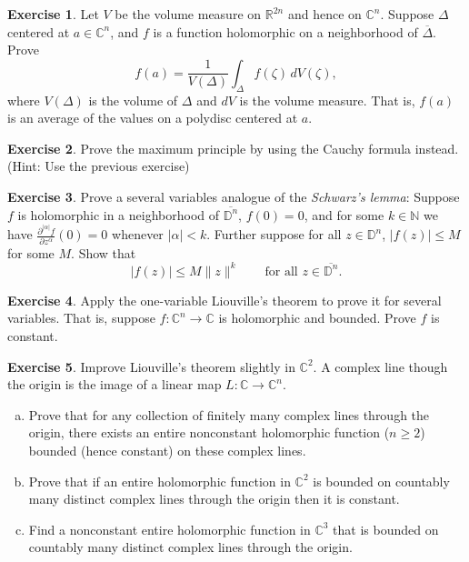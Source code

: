 \documentclass[12pt,openany]{book}
\newcommand{\sabs}[1]{\lvert {#1} \rvert}
\newcommand{\snorm}[1]{\lVert {#1} \rVert}
\newcommand{\C}{{\mathbb{C}}}
\newcommand{\R}{{\mathbb{R}}}
\newcommand{\N}{{\mathbb{N}}}
\newcommand{\D}{{\mathbb{D}}}
\newcommand{\myindex}[1]{#1\index{#1}}
\theoremstyle{plain}
\theoremstyle{remark}
\theoremstyle{definition}
\newenvironment{exbox}{%
    \def\FrameCommand{\vrule width 1pt \relax\hspace {10pt}}%
    \MakeFramed {\advance \hsize -\width \FrameRestore }%
}{%
    \endMakeFramed
}
\newenvironment{exparts}{%
    \leavevmode\begin{enumerate}[a),noitemsep,topsep=0pt,parsep=0pt,partopsep=0pt]
}{%
    \end{enumerate}
}
\theoremstyle{exercise}
\newtheorem{exercise}{Exercise}[section]
\theoremstyle{example}
\begin{document}
\begin{exbox}
\begin{exercise} \label{exercise:averageDelta}
Let $V$ be the volume measure on $\R^{2n}$ and hence on $\C^n$.
Suppose $\Delta$ centered at $a \in \C^n$, and $f$ is a function holomorphic on
a neighborhood of $\overline{\Delta}$.  Prove
\begin{equation*}
f(a) =
\frac{1}{V(\Delta)}
\int_{\Delta} f(\zeta) \, dV(\zeta) ,
\end{equation*}
where $V(\Delta)$ is the volume of $\Delta$ and $dV$ is the volume measure.
That is, $f(a)$ is an average of the values on a polydisc centered at $a$.
\end{exercise}

\begin{exercise}
Prove the maximum principle by using the Cauchy formula instead.  (Hint:
Use the previous exercise)
\end{exercise}

\begin{exercise}
Prove a several variables analogue of the \emph{\myindex{Schwarz's lemma}}:
Suppose $f$ is holomorphic in a neighborhood of $\overline{\D^n}$,
$f(0) = 0$, and for some $k \in \N$ we have
$\frac{\partial^{\sabs{\alpha}} f}{\partial z^\alpha} (0) =
0$ whenever $\sabs{\alpha} < k$.  Further suppose 
for all $z \in \D^n$,
$\sabs{f(z)} \leq M$ for some $M$.  Show that
\begin{equation*}
\sabs{f(z)} \leq M \snorm{z}^k
\qquad
\text{for all $z \in \overline{\D^n}$}.
\end{equation*}
\end{exercise}

\begin{exercise}
Apply the one-variable Liouville's theorem to prove it for several variables.
That is, suppose $f \colon \C^n \to \C$ is holomorphic and bounded.
Prove $f$ is constant.
\end{exercise}

\begin{exercise}
Improve Liouville's theorem slightly in $\C^2$.
A complex line though the origin is
the image of a linear map $L \colon \C \to \C^n$.
\begin{exparts}
\item
Prove that 
for any collection of finitely many complex lines through the origin,
there exists an entire nonconstant holomorphic function ($n \geq 2$)
bounded (hence constant) on these complex lines.
\item
Prove that if an entire holomorphic function in $\C^2$ is bounded on
countably many distinct
complex lines through the origin then it is constant.
\item
Find a nonconstant entire holomorphic function in $\C^3$ that is
bounded on
countably many distinct
complex lines through the origin.
\pagebreak[2]
\end{exparts}
\end{exercise}


\end{exbox}
\end{document}
